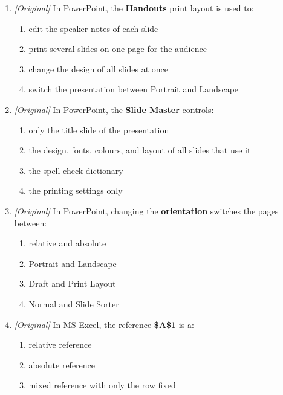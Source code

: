 \begin{enumerate}[label=\textbf{Q\arabic*.}, leftmargin=*]
  \begin{enumerate}[label=\Alph*.]
    \item a bulleted list
    \item a block of text
    \item a table of data
    \item indented text
  \end{enumerate}
\item \textit{[Original]} In PowerPoint, the \textbf{Handouts} print layout is
  used to:
  \begin{enumerate}[label=\Alph*.]
    \item edit the speaker notes of each slide
    \item print several slides on one page for the audience
    \item change the design of all slides at once
    \item switch the presentation between Portrait and Landscape
  \end{enumerate}
\item \textit{[Original]} In PowerPoint, the \textbf{Slide Master} controls:
  \begin{enumerate}[label=\Alph*.]
    \item only the title slide of the presentation
    \item the design, fonts, colours, and layout of all slides that use it
    \item the spell-check dictionary
    \item the printing settings only
  \end{enumerate}
\item \textit{[Original]} In PowerPoint, changing the \textbf{orientation}
  switches the pages between:
  \begin{enumerate}[label=\Alph*.]
    \item relative and absolute
    \item Portrait and Landscape
    \item Draft and Print Layout
    \item Normal and Slide Sorter
  \end{enumerate}
\item \textit{[Original]} In MS Excel, the reference \textbf{\$A\$1} is a:
  \begin{enumerate}[label=\Alph*.]
    \item relative reference
    \item absolute reference
    \item mixed reference with only the row fixed

\end{enumerate}
\end{enumerate}
